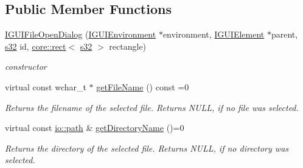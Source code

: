 \subsection*{Public Member Functions}
\begin{DoxyCompactItemize}
\item 
\mbox{\label{classirr_1_1gui_1_1IGUIFileOpenDialog_a81f9db27e22941dc8370b7b7630501db}} 
\hyperlink{classirr_1_1gui_1_1IGUIFileOpenDialog_a81f9db27e22941dc8370b7b7630501db}{I\+G\+U\+I\+File\+Open\+Dialog} (\hyperlink{classirr_1_1gui_1_1IGUIEnvironment}{I\+G\+U\+I\+Environment} $\ast$environment, \hyperlink{classirr_1_1gui_1_1IGUIElement}{I\+G\+U\+I\+Element} $\ast$parent, \hyperlink{namespaceirr_ac66849b7a6ed16e30ebede579f9b47c6}{s32} id, \hyperlink{classirr_1_1core_1_1rect}{core\+::rect}$<$ \hyperlink{namespaceirr_ac66849b7a6ed16e30ebede579f9b47c6}{s32} $>$ rectangle)
\begin{DoxyCompactList}\small\item\em constructor \end{DoxyCompactList}\item 
\mbox{\label{classirr_1_1gui_1_1IGUIFileOpenDialog_aa51c982b5e8264588473c147cd9a5b7b}} 
virtual const wchar\+\_\+t $\ast$ \hyperlink{classirr_1_1gui_1_1IGUIFileOpenDialog_aa51c982b5e8264588473c147cd9a5b7b}{get\+File\+Name} () const =0
\begin{DoxyCompactList}\small\item\em Returns the filename of the selected file. Returns N\+U\+LL, if no file was selected. \end{DoxyCompactList}\item 
\mbox{\label{classirr_1_1gui_1_1IGUIFileOpenDialog_a2bc36296e0efe14992e88c9a1f4f5c61}} 
virtual const \hyperlink{namespaceirr_1_1io_a6468281622ce3a1c46b72e19f32dded5}{io\+::path} \& \hyperlink{classirr_1_1gui_1_1IGUIFileOpenDialog_a2bc36296e0efe14992e88c9a1f4f5c61}{get\+Directory\+Name} ()=0
\begin{DoxyCompactList}\small\item\em Returns the directory of the selected file. Returns N\+U\+LL, if no directory was selected. \end{DoxyCompactList}\item 
\mbox{\label{classirr_1_1gui_1_1IGUIFileOpenDialog_a81f9db27e22941dc8370b7b7630501db}} 

\end{DoxyCompactItemize}
